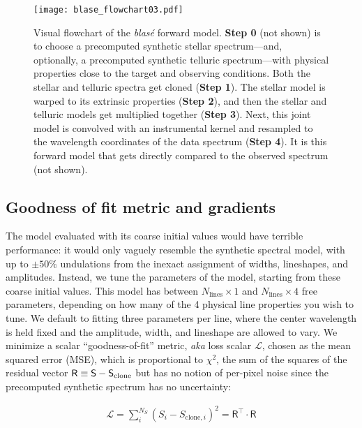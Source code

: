 \documentclass[trackchanges]{aastex631}
\begin{document}
\begin{figure*}[hbt!]
    \centering
    \texttt{[image: blase\_flowchart03.pdf]}
    \caption{Visual flowchart of the  \emph{blas\'e} forward model.  \textbf{Step 0} (not shown) is to choose a precomputed synthetic stellar spectrum---and, optionally, a precomputed synthetic telluric spectrum---with physical properties close to the target and observing conditions.  Both the stellar and telluric spectra get cloned (\textbf{Step 1}).  The stellar model is warped to its extrinsic properties (\textbf{Step 2}), and then the stellar and telluric models get multiplied together (\textbf{Step 3}).  Next, this joint model is convolved with an instrumental kernel and resampled to the wavelength coordinates of the data spectrum (\textbf{Step 4}).  It is this forward model that gets directly compared to the observed spectrum (not shown).
    }
    \label{blase_flowchart}
\end{figure*}

\subsection{Goodness of fit metric and gradients}
The model evaluated with its coarse initial values would have terrible performance: it would only vaguely resemble the synthetic spectral model, with up to $\pm 50\%$ undulations from the inexact assignment of widths, lineshapes, and amplitudes. Instead, we tune the parameters of the model, starting from these coarse initial values. This model has between $N_{\mathrm{lines}}\times 1$ and $N_{\mathrm{lines}}\times 4$ free parameters, depending on how many of the 4 physical line properties you wish to tune.  We default to fitting three parameters per line, where the center wavelength is held fixed and the amplitude, width, and lineshape are allowed to vary. We minimize a scalar ``goodness-of-fit'' metric, \emph{aka} loss scalar $\mathcal{L}$, chosen as the mean squared error (MSE), which is proportional to $\chi^2$, the sum of the squares of the residual vector $\mathsf{R} \equiv \mathsf{S}-\mathsf{S}_{\rm clone}$ but has no notion of per-pixel noise since the precomputed synthetic spectrum has no uncertainty:

\begin{eqnarray}
    \mathcal{L} = \sum_i^{N_S} (S_i - S_{\mathrm{clone},i})^2 = \mathsf{R^\intercal}\cdot \mathsf{R} \label{simpleLikelihood}
\end{eqnarray}
\end{document}
